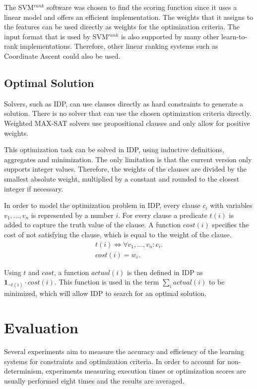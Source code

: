 \documentclass[letterpaper]{article}
\newcommand{\svm}{SVM$^{rank}$}
\theoremstyle{definition}
\begin{document}
The \svm{} software was chosen to find the scoring function since it uses a linear model and offers an efficient implementation.
The weights that it assigns to the features can be used directly as weights for the optimization criteria.
The input format that is used by \svm{} is also supported by many other learn-to-rank implementations.
Therefore, other linear ranking systems such as Coordinate Ascent \cite{metzler2007linear} could also be used.

\subsection{Optimal Solution}
Solvers, such as IDP, can use clauses directly as hard constraints to generate a solution.
There is no solver that can use the chosen optimization criteria directly.
Weighted MAX-SAT solvers use propositional clauses and only allow for positive weights.

This optimization task can be solved in IDP, using inductive definitions, aggregates and minimization.
The only limitation is that the current version only supports integer values.
Therefore, the weights of the clauses are divided by the smallest absolute weight, multiplied by a constant and rounded to the closest integer if necessary.

In order to model the optimization problem in IDP, every clause $c_i$ with variables $v_1, ..., v_n$ is represented by a number $i$. For every clause a predicate $t(i)$ is added to capture the truth value of the clause.
A function $\mathit{cost}(i)$ specifies the cost of not satisfying the clause, which is equal to the weight of the clause.
\begin{eqnarray*}
  t(i) \Leftrightarrow \forall v_1, ..., v_n : c_i. \\
  cost(i) = w_i.
\end{eqnarray*}

Using $t$ and $\mathit{cost}$, a function $\mathit{actual}(i)$ is then defined in IDP as $\mathbf{1}_{\lnot t(i)} \cdot \mathit{cost}(i)$.
This function is used in the term $\sum_i actual(i)$ to be minimized, which will allow IDP to search for an optimal solution.


\section{Evaluation}
Several experiments aim to measure the accuracy and efficiency of the learning systems for constraints and optimization criteria.
In order to account for non-determinism, experiments measuring execution times or optimization scores are usually performed eight times and the results are averaged.
\end{document}
